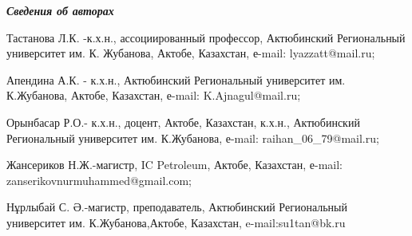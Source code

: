 \emph{{\bfseries Сведения об авторах}}

\begin{noparindent}
Тастанова Л.К. -к.х.н., ассоциированный профессор, Актюбинский
Региональный университет им. К. Жубанова, Актобе, Казахстан, е-mail:
lyazzatt@mail.ru;

Апендина А.К. - к.х.н., Актюбинский Региональный университет им.
К.Жубанова, Актобе, Казахстан, е-mail: K.Ajnagul@mail.ru;

Орынбасар Р.О.- к.х.н., доцент, Актобе, Казахстан, к.х.н., Актюбинский
Региональный университет им. К.Жубанова, е-mail: raihan\_06\_79@mail.ru;

Жансериков Н.Ж.-магистр, IC Petroleum, Актобе, Казахстан, е-mail:
zanserikovnurmuhammed@gmail.com;

Нұрлыбай С. Ә.-магистр, преподаватель, Актюбинский Региональный
университет им. К.Жубанова,Актобе, Казахстан, e-mail:su1tan@bk.ru
\end{noparindent}
